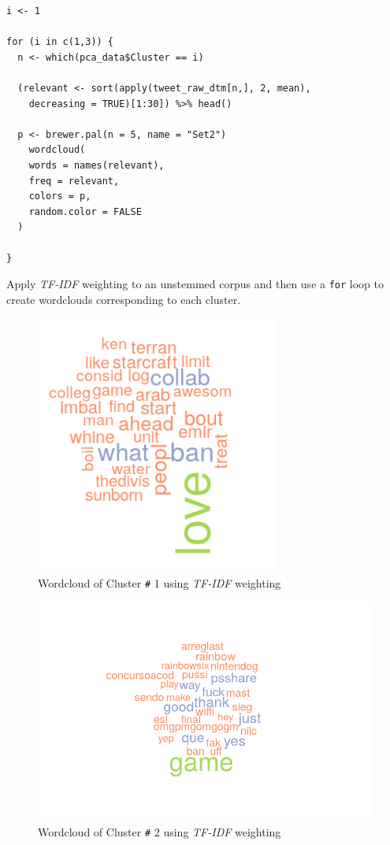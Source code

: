 \documentclass[11pt]{article}
\begin{document}
\begin{listing}[htbp]
\begin{verbatim}
i <- 1

for (i in c(1,3)) {
  n <- which(pca_data$Cluster == i)

  (relevant <- sort(apply(tweet_raw_dtm[n,], 2, mean),
    decreasing = TRUE)[1:30]) %>% head()

  p <- brewer.pal(n = 5, name = "Set2")
    wordcloud(
    words = names(relevant),
    freq = relevant,
    colors = p,
    random.color = FALSE
  )

}
\end{verbatim}
\caption{\label{orgaedce2a}Apply \emph{TF-IDF} weighting to an unstemmed corpus and then use a \texttt{for} loop to create wordclouds corresponding to each cluster.}
\end{listing}

\begin{figure}[htbp]
\centering
\includegraphics[width=8cm]{./Figures/Cluster1Cloud.png}
\caption{\label{fig:orgf623ae0}Wordcloud of Cluster \texttt{\#} 1 using \emph{TF-IDF} weighting}
\end{figure}

\begin{figure}[htbp]
\centering
\includegraphics[width=14cm]{./Figures/Cluster2Cloud.png}
\caption{\label{fig:org264c932}Wordcloud of Cluster \texttt{\#} 2 using \emph{TF-IDF} weighting}
\end{figure}
\end{document}
